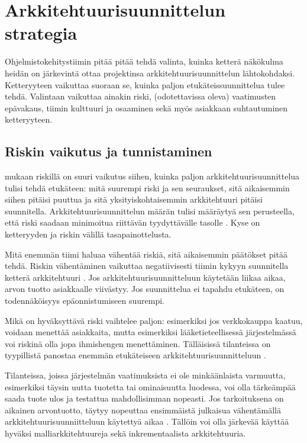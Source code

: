 \chapter{Arkkitehtuurisuunnittelun strategia}
Ohjelmistokehitystiimin pitää pitää tehdä valinta, kuinka ketterä näkökulma heidän on järkevintä ottaa projektinsa arkkitehtuurisuunnittelun lähtokohdaksi. Ketteryyteen vaikuttaa suoraan se, kuinka paljon etukäteissuunnittelua tulee tehdä. Valintaan vaikuttaa ainakin riski, (odotettavissa oleva) vaatimusten epävakaus, tiimin kulttuuri ja osaaminen sekä myös asiakkaan suhtautuminen ketteryyteen.

\section{Riskin vaikutus ja tunnistaminen}

\cite{waterman_agility_2018_b} mukaan riskillä on suuri vaikutus siihen, kuinka paljon arkkitehtuurisuunnittelua tulisi tehdä etukäteen: mitä suurempi riski ja sen seuraukset, sitä aikaisemmin siihen pitäisi puuttua ja sitä yksityiskohtaisemmin arkkitehtuuri pitäisi suunnitella. Arkkitehtuurisuunnittelun määrän tulisi määräytyä sen perusteella, että riski saadaan minimoitua riittävän tyydyttävälle tasolle \citep{fairbanks2010just}. Kyse on ketteryyden ja riskin välillä tasapainottelusta.

Mitä enemmän tiimi haluaa vähentää riskiä, sitä aikaisemmin päätökset pitää tehdä.
Riskin vähentäminen vaikuttaa negatiivisesti tiimin kykyyn suunnitella ketterä arkkitehtuuri \citep{waterman_agility_2018_b}. Jos arkkitehtuurisuunnitteluun käytetään liikaa aikaa, arvon tuotto asiakkaalle viivästyy. Jos suunnittelua ei tapahdu etukäteen, on todennäköisyys epäonnistumiseen suurempi.

Mikä on hyväksyttävä riski vaihtelee paljon: esimerkiksi jos verkkokauppa kaatuu, voidaan menettää asiakkaita, mutta esimerkiksi lääketieteellisessä järjestelmässä voi riskinä olla jopa ihmishengen menettäminen. Tälläisissä tilanteissa on tyypillistä panostaa enemmän etukäteiseen arkkitehtuurisuunnitteluun \citep{waterman_agility_2018_b}. 

Tilanteissa, joissa järjestelmän vaatimuksista ei ole minkäänlaista varmuutta, esimerkiksi täysin uutta tuotetta tai ominaisuutta luodessa, voi olla tärkeämpää saada tuote ulos ja testattua mahdollisimman nopeasti. Jos tarkoituksena on aikainen arvontuotto, täytyy nopeuttaa ensimmäistä julkaisua vähentämällä arkkitehtuurisuunniitteluun käytettyä aikaa \citep{waterman_how_2015}. Tällöin voi olla järkevää käyttää hyväksi malliarkkitehtuureja sekä inkrementaalista arkkitehtuuria.

